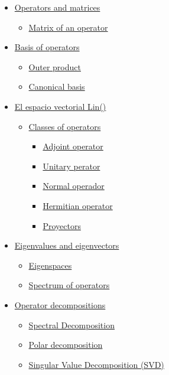 \documentclass[11pt]{article}
\providecommand{\tightlist}{%
      \setlength{\itemsep}{0pt}\setlength{\parskip}{0pt}}
\begin{document}
    \begin{itemize}
\item
  \hyperref[opdefi]{Operators and matrices}

  \begin{itemize}
  \tightlist
  \item
    \hyperref[matriz_op]{Matrix of an operator}\\
  \end{itemize}
\item
  \hyperref[op_basis]{Basis of operators}

  \begin{itemize}
  \item
    \hyperref[prod_ext]{Outer product}
  \item
    \hyperref[base_can]{Canonical basis}
  \end{itemize}
\end{itemize}

\begin{itemize}
\item
  \hyperref[linh]{El espacio vectorial Lin(\Hil)}

  \begin{itemize}
  \item
    \hyperref[op_class]{Classes of operators}

    \begin{itemize}
    \item
      \hyperref[opadj]{Adjoint operator}
    \item
      \hyperref[opunit]{Unitary perator}
    \item
      \hyperref[opnormal]{Normal operador}
    \item
      \hyperref[opermit]{Hermitian operator}
    \item
      \hyperref[opproyec]{Proyectors}
    \end{itemize}
  \end{itemize}
\item
  \hyperref[eigen]{Eigenvalues and eigenvectors}

  \begin{itemize}
  \item
    \hyperref[subesprop]{Eigenspaces}
  \item
    \hyperref[especope]{Spectrum of operators}
  \end{itemize}
\end{itemize}

\begin{itemize}
\item
  \hyperref[op_decomp]{Operator decompositions}

  \begin{itemize}
  \item
    \hyperref[spec_dec]{Spectral Decomposition}
  \item
    \hyperref[pol_dec]{Polar decomposition}
  \item
    \hyperref[svd_dec]{Singular Value Decomposition (SVD)}
  \end{itemize}
\end{itemize}
\end{document}
